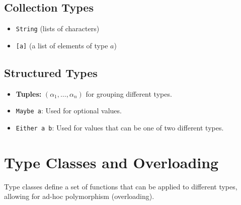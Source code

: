 \documentclass[12pt]{article}
\begin{document}
\subsection{Collection Types}
\begin{itemize}
  \item \texttt{String} (lists of characters)
  \item \texttt{[a]} (a list of elements of type $a$)
\end{itemize}

\subsection{Structured Types}
\begin{itemize}
  \item \textbf{Tuples:} $(\alpha_1, \dots, \alpha_n)$ for grouping different types.
  \item \texttt{Maybe a}: Used for optional values.
  \item \texttt{Either a b}: Used for values that can be one of two different types.
\end{itemize}

\section{Type Classes and Overloading}

Type classes define a set of functions that can be applied to different types, allowing for ad-hoc polymorphism (overloading).
\end{document}
